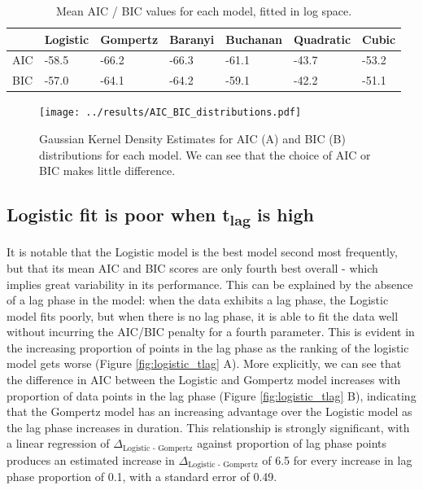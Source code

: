 \documentclass[11pt, a4paper]{article}
\begin{document}
\begin{linenumbers}
         \begin{table}[H]
\centering
\begin{tabular}{l|llllll}
       & Logistic & Gompertz & Baranyi & Buchanan & Quadratic & Cubic \\ \hline
AIC & -58.5    & -66.2    & -66.3   & -61.1    & -43.7     & -53.2 \\
BIC & -57.0    & -64.1    & -64.2   & -59.1    & -42.2     & -51.1
\end{tabular}
\caption{Mean AIC / BIC values for each model, fitted in log space.}
\label{table:meanAICBIC}
\end{table}


        \begin{figure}[H]
        \texttt{[image: ../results/AIC\_BIC\_distributions.pdf]}
        \caption{Gaussian Kernel Density Estimates for AIC (A) and BIC (B) distributions for each model. We can see that the choice of AIC or BIC makes little difference.}
        \label{fig:AICBICdist}
        \end{figure}
        
        

        
        \subsection{Logistic fit is poor when t\textsubscript{lag} is high}
        
        It is notable that the Logistic model is the best model second most frequently, but that its mean AIC and BIC scores are only fourth best overall - which implies great variability in its performance. This can be explained by the absence of a lag phase in the model: when the data exhibits a lag phase, the Logistic model fits poorly, but when there is no lag phase, it is able to fit the data well without incurring the AIC/BIC penalty for a fourth parameter. This is evident in the increasing proportion of points in the lag phase as the ranking of the logistic model gets worse (Figure \ref{fig:logistic_tlag} A). More explicitly, we can see that the difference in AIC between the Logistic and Gompertz model increases with proportion of data points in the lag phase (Figure \ref{fig:logistic_tlag} B), indicating that the Gompertz model has an increasing advantage over the Logistic model as the lag phase increases in duration. This relationship is strongly significant, with a linear regression of $\Delta_{\text{Logistic - Gompertz}}$ against proportion of lag phase points produces an estimated increase in $\Delta_{\text{Logistic - Gompertz}}$ of 6.5 for every increase in lag phase proportion of 0.1, with a standard error of 0.49.
        

\end{linenumbers}
\end{document}
